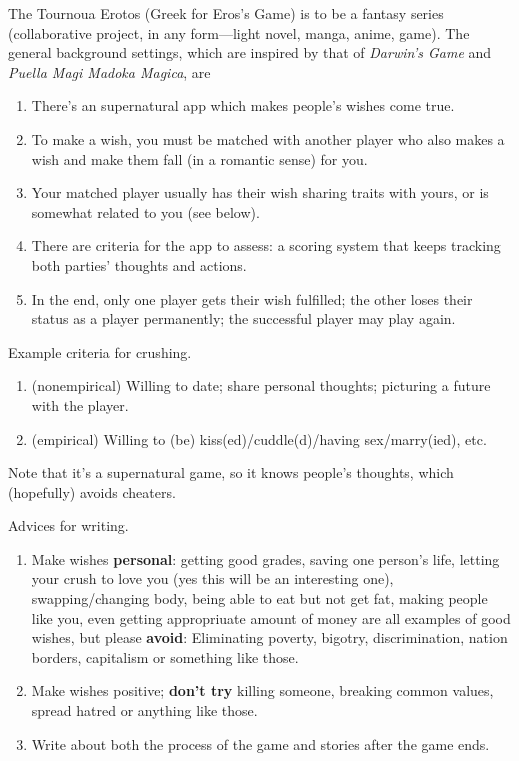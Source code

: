 \documentclass[10pt]{report}
\theoremstyle{definition}
\begin{document}
The Tournoua Erotos (Greek for Eros's Game) is to be a fantasy series (collaborative project, in any form---light novel, manga, anime, game). The general background settings, which are inspired by that of \textit{Darwin's Game} and \textit{Puella Magi Madoka Magica}, are
\begin{enumerate}
\item
There's an supernatural app which makes people's wishes come true.
\item
To make a wish, you must be matched with another player who also makes a wish and make them fall (in a romantic sense) for you.
\item
Your matched player usually has their wish sharing traits with yours, or is somewhat related to you (see below).
\item
There are criteria for the app to assess: a scoring system that keeps tracking both parties' thoughts and actions.
\item
In the end, only one player gets their wish fulfilled; the other loses their status as a player permanently; the successful player may play again.
\end{enumerate}

Example criteria for crushing.
\begin{enumerate}
\item (nonempirical) Willing to date; share personal thoughts; picturing a future with the player.
\item (empirical) Willing to (be) kiss(ed)/cuddle(d)/having sex/marry(ied), etc.
\end{enumerate}
Note that it's a supernatural game, so it knows people's thoughts, which (hopefully) avoids cheaters.

Advices for writing.
\begin{enumerate}
\item
Make wishes \textbf{personal}: getting good grades, saving one person's life, letting your crush to love you (yes this will be an interesting one), swapping/changing body, being able to eat but not get fat, making people like you, even getting appropriuate amount of money are all examples of good wishes, but please \textbf{avoid}: Eliminating poverty, bigotry, discrimination, nation borders, capitalism or something like those.
\item
Make wishes positive; \textbf{don't try} killing someone, breaking common values, spread hatred or anything like those.
\item
Write about both the process of the game and stories after the game ends.
\end{enumerate}
\end{document}
